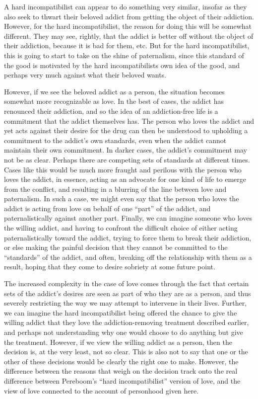 \documentclass[phd,12pt,oneside,paper=letterpaper]{ubcthesis}
\begin{document}
A hard incompatibilist can appear to do something very similar, insofar as they also seek to thwart their beloved addict from getting the object of their addiction. However, for the hard incompatibilist, the reason for doing this will be somewhat different. They may see, rightly, that the addict is better off without the object of their addiction, because it is bad for them, etc. But for the hard incompatibilist, this is going to start to take on the shine of paternalism, since this standard of the good is motivated by the hard incompatibilists own idea of the good, and perhaps very much against what their beloved wants.

However, if we see the beloved addict as a person, the situation becomes somewhat more recognizable as love. In the best of cases, the addict has renounced their addiction, and so the idea of an addiction-free life is a commitment that the addict themselves has. The person who loves the addict and yet acts against their desire for the drug can then be understood to upholding a commitment to the addict's own standards, even when the addict cannot maintain their own commitment. In darker cases, the addict's commitment may not be as clear. Perhaps there are competing sets of standards at different times. Cases like this would be much more fraught and perilous with the person who loves the addict, in essence, acting as an advocate for one kind of life to emerge from the conflict, and resulting in a blurring of the line between love and paternalism. In such a case, we might even say that the person who loves the addict is acting from love on behalf of one ``part'' of the addict, and paternalistically against another part. Finally, we can imagine someone who loves the willing addict, and having to confront the difficult choice of either acting paternalistically toward the addict, trying to force them to break their addiction, or else making the painful decision that they cannot be committed to the ``standards'' of the addict, and often, breaking off the relationship with them as a result, hoping that they come to desire sobriety at some future point. 

The increased complexity in the case of love comes through the fact that certain sets of the addict's desires are seen as part of who they are as a person, and thus severely restricting the way we may attempt to intervene in their lives. Further, we can imagine the hard incompatibilist being offered the chance to give the willing addict that they love the addiction-removing treatment described earlier, and perhaps not understanding why one would choose to do anything but give the treatment. However, if we view the willing addict as a person, then the decision is, at the very least, not so clear. This is also not to say that one or the other of these decisions would be clearly the right one to make. However, the difference between the reasons that weigh on the decision track onto the real difference between Pereboom's ``hard incompatibilist'' version of love, and the view of love connected to the account of personhood given here. 
\end{document}
